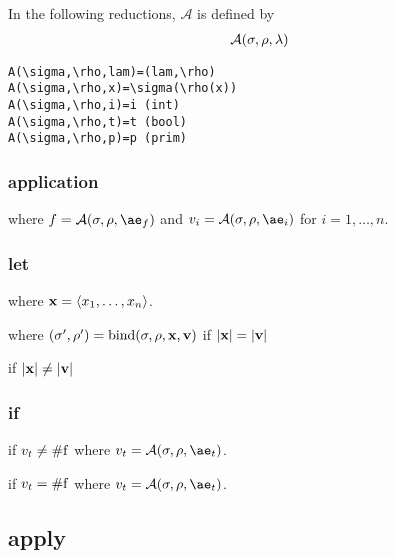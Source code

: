 \documentclass{sigplanconf}
\begin{document}
In the following reductions, $\mathcal{A}$ is defined by
\begin{align*}
\mathcal{A}(\sigma,\rho,\lambda)
\end{align*}
\begin{verbatim}
A(\sigma,\rho,lam)=(lam,\rho)
A(\sigma,\rho,x)=\sigma(\rho(x))
A(\sigma,\rho,i)=i (int)
A(\sigma,\rho,t)=t (bool)
A(\sigma,\rho,p)=p (prim)
\end{verbatim}

\subsubsection{application}

\noindent
{}

\noindent
where $f=\A{\sigma}{\rho}{\ae_f}$ and $v_i=\A{\sigma}{\rho}{\ae_i}$ for $i=1,\dots,n$.

\subsubsection{let}

\noindent
{}

\noindent
where $\mathbf{x}=\langle x_1,\dots,x_n\rangle$.


\noindent
where $(\sigma',\rho')=\mathrm{bind}(\sigma,\rho,\mathbf{x},\mathbf{v})$ if $|\mathbf{x}|=|\mathbf{v}|$

 if $|\mathbf{x}|\ne|\mathbf{v}|$

\subsubsection{if}

if $v_t\ne\mathrm{\#f}$
where $v_t=\A{\sigma}{\rho}{\ae_t}$.

if $v_t=\mathrm{\#f}$
where $v_t=\A{\sigma}{\rho}{\ae_t}$.

\subsection{apply}
\end{document}
